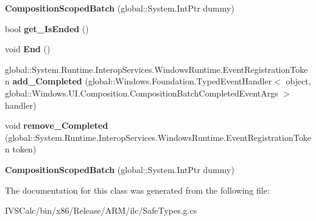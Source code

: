 \begin{DoxyCompactItemize}
{\bfseries Composition\+Scoped\+Batch} (global\+::\+System.\+Int\+Ptr dummy)
\item 
\mbox{\label{class_windows_1_1_u_i_1_1_composition_1_1_composition_scoped_batch_ad036352a5e49eca6ca9a5625c9241c44}} 
bool {\bfseries get\+\_\+\+Is\+Ended} ()
\item 
\mbox{\label{class_windows_1_1_u_i_1_1_composition_1_1_composition_scoped_batch_ac9207d343cd71dfa95d2843f2cad44a3}} 
void {\bfseries End} ()
\item 
\mbox{\label{class_windows_1_1_u_i_1_1_composition_1_1_composition_scoped_batch_a2eaf35d8ee5b83da80dbb51535e15735}} 
global\+::\+System.\+Runtime.\+Interop\+Services.\+Windows\+Runtime.\+Event\+Registration\+Token {\bfseries add\+\_\+\+Completed} (global\+::\+Windows.\+Foundation.\+Typed\+Event\+Handler$<$ object, global\+::\+Windows.\+U\+I.\+Composition.\+Composition\+Batch\+Completed\+Event\+Args $>$ handler)
\item 
\mbox{\label{class_windows_1_1_u_i_1_1_composition_1_1_composition_scoped_batch_a1fca5e233b1f087147733edf215d083d}} 
void {\bfseries remove\+\_\+\+Completed} (global\+::\+System.\+Runtime.\+Interop\+Services.\+Windows\+Runtime.\+Event\+Registration\+Token token)
\item 
\mbox{\label{class_windows_1_1_u_i_1_1_composition_1_1_composition_scoped_batch_aabd378de67b654d720bcd539222f242d}} 
{\bfseries Composition\+Scoped\+Batch} (global\+::\+System.\+Int\+Ptr dummy)
\end{DoxyCompactItemize}


The documentation for this class was generated from the following file\+:\begin{DoxyCompactItemize}
\item 
I\+V\+S\+Calc/bin/x86/\+Release/\+A\+R\+M/ilc/Safe\+Types.\+g.\+cs\end{DoxyCompactItemize}
